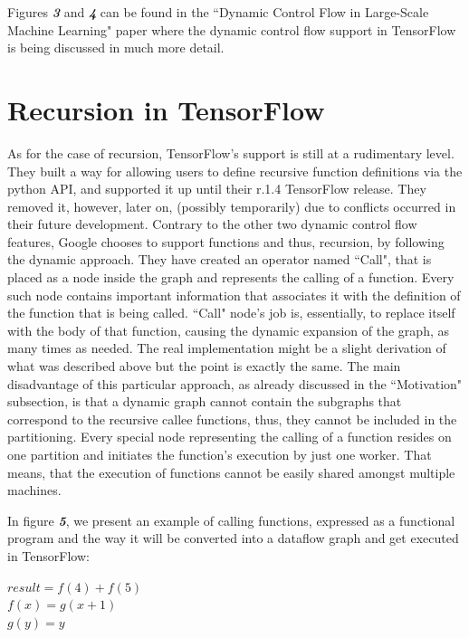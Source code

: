 \documentclass[ack,preface]{dithesis}
\begin{document}
Figures \textit{\textbf{3}} and \textit{\textbf{4}}  can be found in the ``Dynamic Control Flow in Large-Scale Machine Learning" paper  \cite{Yu:2018} where the dynamic control flow support in TensorFlow is being discussed in much more detail. 

\section{Recursion in TensorFlow}
As for the case of recursion, TensorFlow's support is still at a rudimentary level. They built a way for allowing users to define recursive function definitions via the python API,  and supported it up until their r.1.4 TensorFlow release. They removed it, however, later on, (possibly temporarily) due to conflicts occurred in their future development. Contrary to the other two dynamic control flow features, Google chooses to support functions and thus, recursion, by following the dynamic approach.  They have created an operator named ``Call", that is placed as a node inside the graph and represents the calling of a function. Every such node contains important information that associates it with the definition  of the function that is being called.  ``Call" node's job is, essentially,  to replace itself with the body of that function, causing the dynamic expansion of the graph, as many times as needed. The real implementation might be a slight derivation of what was described above but the point is exactly the same.
The main disadvantage of this particular approach, as already discussed in the ``Motivation" subsection, is that a dynamic graph  cannot contain the subgraphs that correspond to the recursive callee functions, thus, they cannot be included in the partitioning. Every special node representing the calling of a function resides on one partition and initiates the function's execution by just one worker. That means, that the execution of functions cannot be easily shared amongst multiple machines.

\begin{flushleft}
  In figure \textit{\textbf{5}}, we present an example of calling functions, expressed as a functional program and the way it will be converted into a dataflow graph and get executed in TensorFlow:

 \setlength{\parindent}{25ex} $result = f(4) + f(5)$ \\
$f(x) = g(x+1)$ \\ 
$g(y) = y$
\end{flushleft}
\end{document}
